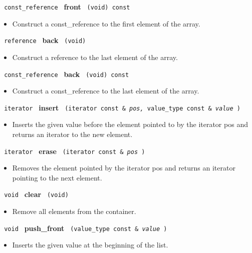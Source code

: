 \noindent
\texttt{%
const\_reference
}
\textbf{front}%
\texttt{%
(void) const
}

\begin{itemize}
\item
Construct a const\_reference to the first element of the array.
\end{itemize}
 
\noindent
\texttt{%
reference
}
\textbf{back}%
\texttt{%
(void)
}

\begin{itemize}
\item
Construct a reference to the last element of the array.
\end{itemize}
 
\noindent
\texttt{%
const\_reference
}
\textbf{back}%
\texttt{%
(void) const
}

\begin{itemize}
\item
Construct a const\_reference to the last element of the array.
\end{itemize}

 
\noindent
\texttt{%
iterator 	
}
\textbf{insert}%
\texttt{
(iterator const \&
\textit{pos,}%
value\_type const \&
\textit{value}%
)
}

\begin{itemize}
\item
Inserts the given value before the element pointed to by the iterator pos and returns an iterator to the new element.
\end{itemize}
 
\noindent
\texttt{%
iterator 	
}
\textbf{erase}%
\texttt{
(iterator const \&
\textit{pos}%
)
}
 	
\begin{itemize}
\item
Removes the element pointed by the iterator pos and returns an iterator pointing to the next element.
\end{itemize}
 
\noindent
\texttt{%
void 
}
\textbf{clear}%
\texttt{
(void)
}

\begin{itemize}
\item
Remove all elements from the container. 
\end{itemize}
 
\noindent
\texttt{%
void 	
}
\textbf{push\_front}%
\texttt{
(value\_type const \&
\textit{value}%
)
}

\begin{itemize}
\item
Inserts the given value at the beginning of the list.
\end{itemize}
 
